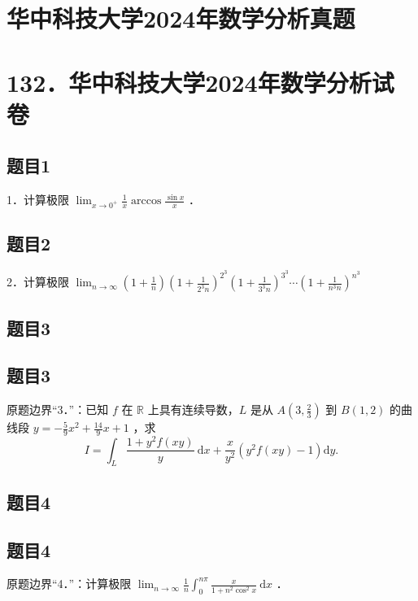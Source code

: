 \documentclass{article}
\begin{document}
\section*{华中科技大学2024年数学分析真题}
\section*{132．华中科技大学2024年数学分析试卷}

\subsection{题目1}
1．计算极限 \(\lim _{x \rightarrow 0^{+}} \frac{1}{x} \arccos \frac{\sin x}{x}\) ．

\subsection{题目2}
2．计算极限 \(\lim _{n \rightarrow \infty}\left(1+\frac{1}{n}\right)\left(1+\frac{1}{2^{3} n}\right)^{2^{3}}\left(1+\frac{1}{3^{3} n}\right)^{3^{3}} \cdots\left(1+\frac{1}{n^{3} n}\right)^{n^{3}}\)

\begin{itemize}

\subsection{题目3}
\end{itemize}

\subsection{题目3}
原题边界“3．”：已知 \(f\) 在 \(\mathbb{R}\) 上具有连续导数，\(L\) 是从 \(A\left(3, \frac{2}{3}\right)\) 到 \(B(1,2)\) 的曲线段 \(y=-\frac{5}{9} x^{2}+\frac{14}{9} x+1\) ，求
\[
I=\int_{L} \frac{1+y^{2} f(x y)}{y} \mathrm{~d} x+\frac{x}{y^{2}}\left(y^{2} f(x y)-1\right) \mathrm{d} y .
\]

\subsection{题目4}

\subsection{题目4}
原题边界“4．”：计算极限 \(\lim _{n \rightarrow \infty} \frac{1}{n} \int_{0}^{n \pi} \frac{x}{1+n^{2} \cos ^{2} x} \mathrm{~d} x\) ．
\end{document}
